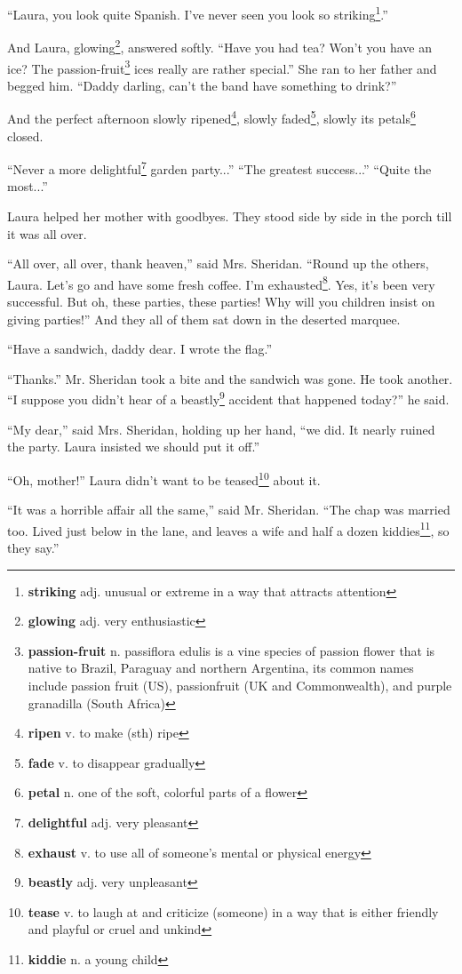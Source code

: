 ``Laura, you look quite Spanish. I've never seen you look so striking\footnote{\textbf{striking} adj. unusual or extreme in a way that attracts attention}.''

And Laura, glowing\footnote{\textbf{glowing} adj. very enthusiastic}, answered softly. ``Have you had tea? Won't you have an ice? The passion-fruit\footnote{\textbf{passion-fruit} n. passiflora edulis is a vine species of passion flower that is native to Brazil, Paraguay and northern Argentina, its common names include passion fruit (US), passionfruit (UK and Commonwealth), and purple granadilla (South Africa)} ices really are rather special.'' She ran to her father and begged him. ``Daddy darling, can't the band have something to drink?''

And the perfect afternoon slowly ripened\footnote{\textbf{ripen} v. to make (sth) ripe}, slowly faded\footnote{\textbf{fade} v. to disappear gradually}, slowly its petals\footnote{\textbf{petal} n. one of the soft, colorful parts of a flower} closed.

``Never a more delightful\footnote{\textbf{delightful} adj. very pleasant} garden party...'' ``The greatest success...'' ``Quite the most...''

Laura helped her mother with goodbyes. They stood side by side in the porch till it was all over.

``All over, all over, thank heaven,'' said Mrs. Sheridan. ``Round up the others, Laura. Let's go and have some fresh coffee. I'm exhausted\footnote{\textbf{exhaust} v. to use all of someone's mental or physical energy}. Yes, it's been very successful. But oh, these parties, these parties! Why will you children insist on giving parties!'' And they all of them sat down in the deserted marquee.

``Have a sandwich, daddy dear. I wrote the flag.''

``Thanks.'' Mr. Sheridan took a bite and the sandwich was gone. He took another. ``I suppose you didn't hear of a beastly\footnote{\textbf{beastly} adj. very unpleasant} accident that happened today?'' he said.

``My dear,'' said Mrs. Sheridan, holding up her hand, ``we did. It nearly ruined the party. Laura insisted we should put it off.''

``Oh, mother!'' Laura didn't want to be teased\footnote{\textbf{tease} v. to laugh at and criticize (someone) in a way that is either friendly and playful or cruel and unkind} about it.

``It was a horrible affair all the same,'' said Mr. Sheridan. ``The chap was married too. Lived just below in the lane, and leaves a wife and half a dozen kiddies\footnote{\textbf{kiddie} n. a young child}, so they say.''

